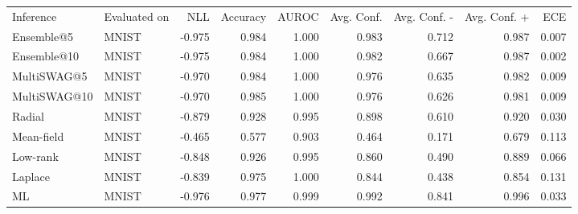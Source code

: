 \begin{tabular}{llrrrrrrr}
Inference & Evaluated on & NLL & Accuracy & AUROC & Avg. Conf. & Avg. Conf. - & Avg. Conf. + & ECE \\
Ensemble@5 & MNIST & -0.975 & 0.984 & 1.000 & 0.983 & 0.712 & 0.987 & 0.007 \\
Ensemble@10 & MNIST & -0.975 & 0.984 & 1.000 & 0.982 & 0.667 & 0.987 & 0.002 \\
MultiSWAG@5 & MNIST & -0.970 & 0.984 & 1.000 & 0.976 & 0.635 & 0.982 & 0.009 \\
MultiSWAG@10 & MNIST & -0.970 & 0.985 & 1.000 & 0.976 & 0.626 & 0.981 & 0.009 \\
Radial & MNIST & -0.879 & 0.928 & 0.995 & 0.898 & 0.610 & 0.920 & 0.030 \\
Mean-field & MNIST & -0.465 & 0.577 & 0.903 & 0.464 & 0.171 & 0.679 & 0.113 \\
Low-rank & MNIST & -0.848 & 0.926 & 0.995 & 0.860 & 0.490 & 0.889 & 0.066 \\
Laplace & MNIST & -0.839 & 0.975 & 1.000 & 0.844 & 0.438 & 0.854 & 0.131 \\
ML & MNIST & -0.976 & 0.977 & 0.999 & 0.992 & 0.841 & 0.996 & 0.033 \\
\end{tabular}
